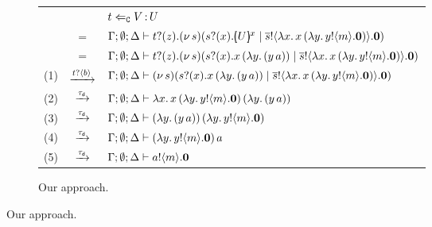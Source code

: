 \begin{example}
	
%
%

\begin{figure}
\begin{subfigure}[t]{\textwidth}
	\begin{tabular}{rcl}
         &    &   $t \Leftarrow_{\mathtt{C}} V{\,:\,}U$   
         \\[1mm]
		   &  $=$ & $\Gamma; \emptyset; \Delta \vdash t ? (z) . (\nu\, s)( s ? (x) . [\!\!(U)\!\!]^{x}  \;|\; \overline{s} ! \langle \lambda x.\,x\, {(}\lambda y.\,y ! \langle m \rangle . \mathbf{0}) \rangle . \mathbf{0})$ 
		   \\[1mm]
		&  $=$& $\Gamma; \emptyset; \Delta \vdash t ? (z) . (\nu\, s)(s ? (x) . x\, {(\lambda y.\,(y\, {a}))} \;|\; \overline{s} ! \langle \lambda x.\,x\, {(}\lambda y.\,y ! \langle m \rangle . \mathbf{0}) \rangle . \mathbf{0})$
		 \\[1mm]
		(1)   &$\xrightarrow{t ? \langle b \rangle}$& $\Gamma; \emptyset; \Delta \vdash (\nu\, s)(s ? (x) . x\, {(\lambda y.\,(y\, {a}))} \;|\; \overline{s} ! \langle \lambda x.\,x\, {(}\lambda y.\,y ! \langle m \rangle . \mathbf{0}) \rangle . \mathbf{0})$\\
		(2)  &$\xrightarrow{\tau_{\mathsf{d}}}$& $\Gamma; \emptyset; \Delta \vdash \lambda x.\,x\, {(}\lambda y.\,y ! \langle m \rangle . \mathbf{0})\, {(\lambda y.\,(y\, {a}))}$\\
		(3)  &$\xrightarrow{\tau_{\mathsf{d}}}$& $\Gamma; \emptyset; \Delta \vdash (\lambda y.\,(y\, {a}))\, {(\lambda y.\,y ! \langle m \rangle . \mathbf{0})} $\\
		(4)   &$\xrightarrow{\tau_{\mathsf{d}}}$& $\Gamma; \emptyset; \Delta \vdash (\lambda y.\,y ! \langle m \rangle . \mathbf{0})\, {a}$\\
		(5)   &$\xrightarrow{\tau_{\mathsf{d}}}$& $\Gamma; \emptyset; \Delta \vdash a ! \langle m \rangle . \mathbf{0}$   %
	\end{tabular} 
	\caption{Our approach.}\label{tablejr:1}
	\end{subfigure}


\end{figure}
\end{example}
